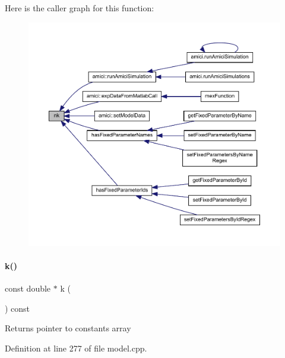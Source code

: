 Here is the caller graph for this function\+:
\nopagebreak
\begin{figure}[H]
\begin{center}
\leavevmode
\includegraphics[width=350pt]{classamici_1_1_model_a3d4130da64883565a06a86e7d6029da1_icgraph}
\end{center}
\end{figure}
\mbox{\label{classamici_1_1_model_adde50e0d8a99d20354c8403bf93fab6f}} 
\paragraph{\texorpdfstring{k()}{k()}}
{\footnotesize\ttfamily const double $\ast$ k (\begin{DoxyParamCaption}{ }\end{DoxyParamCaption}) const}

\begin{DoxyReturn}{Returns}
pointer to constants array 
\end{DoxyReturn}


Definition at line 277 of file model.\+cpp.

